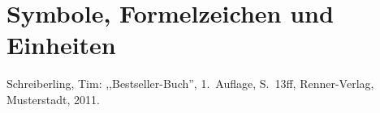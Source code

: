 \documentclass[12pt,oneside]{report}
\begin{document}
  \chapter*{Symbole, Formelzeichen und Einheiten}
  \newpage
  
  
 
  \begin{thebibliography}{10}
     Schreiberling, Tim: ,,Bestseller-Buch'', 1.~Auflage, S.~13ff, Renner-Verlag, Musterstadt, 2011.
  \end{thebibliography}
  \newpage
  
  \listoffigures
  \newpage

  \listoftables
  \newpage
  
\end{document}
